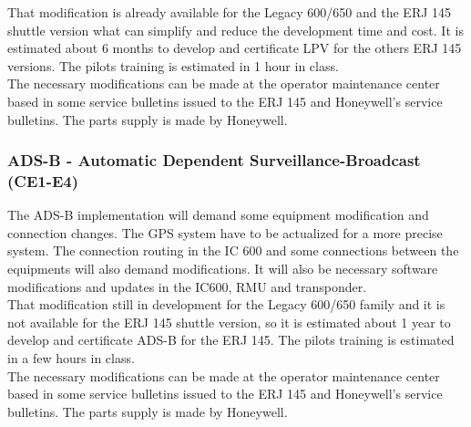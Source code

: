 That modification is already available for the Legacy 600/650 and the ERJ 145 shuttle version what can simplify and reduce the development time and cost. It is estimated about 6 months to develop and certificate LPV for the others ERJ 145 versions. The pilots training is estimated in 1 hour in class.
\\The necessary modifications can be made at the operator maintenance center based in some service bulletins issued to the ERJ 145 and Honeywell's service bulletins. The parts supply is made by Honeywell.


\subsubsection{ADS-B - Automatic Dependent Surveillance-Broadcast (CE1-E4)}
The ADS-B implementation will demand some equipment modification and connection changes. The GPS system have to be actualized for a more precise system. The connection routing in the IC 600 and some connections between the equipments will also demand modifications. It will also be necessary software modifications and updates in the IC600, RMU and transponder.
\\That modification still in development for the Legacy 600/650 family and it is not available for the ERJ 145 shuttle version, so it is estimated about 1 year to develop and certificate ADS-B for the ERJ 145. The pilots training is estimated in a few hours in class.
\\The necessary modifications can be made at the operator maintenance center based in some service bulletins issued to the ERJ 145 and Honeywell's service bulletins. The parts supply is made by Honeywell.


